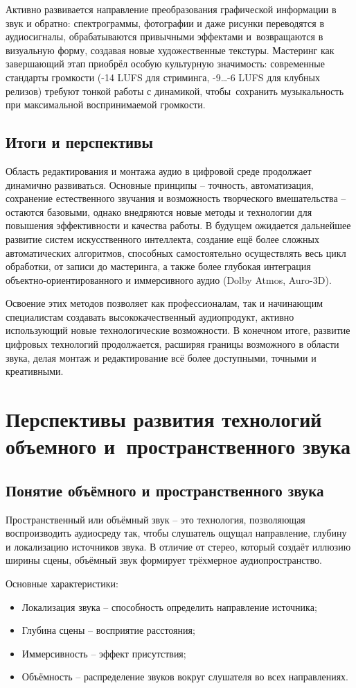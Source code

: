 \documentclass{ou}
\begin{document}
Активно развивается направление преобразования графической информации в звук и обратно: спектрограммы, фотографии и даже рисунки переводятся в аудиосигналы, обрабатываются привычными эффектами и~возвращаются в визуальную форму, создавая новые художественные текстуры. Мастеринг как завершающий этап приобрёл особую культурную значимость: современные стандарты громкости (-14 LUFS для стриминга, -9…-6 LUFS для клубных релизов) требуют тонкой работы с динамикой, чтобы~сохранить музыкальность при максимальной воспринимаемой громкости.
\subsection{Итоги и перспективы}
Область редактирования и монтажа аудио в цифровой среде продолжает динамично развиваться. Основные принципы -- точность, автоматизация, сохранение естественного звучания и возможность творческого вмешательства -- остаются базовыми, однако внедряются новые методы и технологии для повышения эффективности и качества работы. В будущем ожидается дальнейшее развитие систем искусственного интеллекта, создание ещё более сложных автоматических алгоритмов, способных самостоятельно осуществлять весь цикл обработки, от записи до мастеринга, а также более глубокая интеграция объектно-ориентированного и иммерсивного аудио (Dolby Atmos, Auro-3D).

Освоение этих методов позволяет как профессионалам, так и начинающим специалистам создавать высококачественный аудиопродукт, активно использующий новые технологические возможности. В конечном итоге, развитие цифровых технологий продолжается, расширяя границы возможного в области звука, делая монтаж и редактирование всё более доступными, точными и креативными.
\newpage
\section{Перспективы развития технологий объемного и~пространственного звука}
\subsection{Понятие объёмного и пространственного звука}
Пространственный или объёмный звук -- это технология, позволяющая воспроизводить аудиосреду так, чтобы слушатель ощущал направление, глубину и локализацию источников звука. В отличие от стерео, который создаёт иллюзию ширины сцены, объёмный звук формирует трёхмерное аудиопространство.

Основные характеристики:
\begin{itemize}[label=-, leftmargin=0em, itemindent=3.35em, nosep]
\item Локализация звука -- способность определить направление источника;
\item Глубина сцены -- восприятие расстояния;
\item Иммерсивность -- эффект присутствия;
\item Объёмность -- распределение звуков вокруг слушателя во всех направлениях.
\end{itemize}
\end{document}

